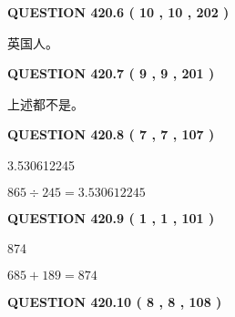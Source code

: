 \documentclass{ctexart}
\begin{document}
{\textbf{\Large{QUESTION
420.6 
 ( 10 , 10 , 202 )
}}}
  
  
 
 
\noindent{}
 
 
英国人。
 
 
 
 
  
\vspace{0.2in}
  
{\textbf{\Large{QUESTION
420.7 
 ( 9 , 9 , 201 )
}}}
  
  
 
 
\noindent{}
 
 
 上述都不是。
 
 
 
 
  
\vspace{0.2in}
  
{\textbf{\Large{QUESTION
420.8 
 ( 7 , 7 , 107 )
}}}
  
  
 
 
\noindent{}

3.530612245
 
 
 
 
\noindent{}

$ %
865 \div  %
245=   %
3.530612245$
 
 
  
\vspace{0.2in}
  
{\textbf{\Large{QUESTION
420.9 
 ( 1 , 1 , 101 )
}}}
  
  
 
 
\noindent{}

874
 
 
 
 
\noindent{}

$ %
685 +  %
189=   %
874$
 
 
  
\vspace{0.2in}
  
{\textbf{\Large{QUESTION
420.10 
 ( 8 , 8 , 108 )
}}}
  
\end{document}

